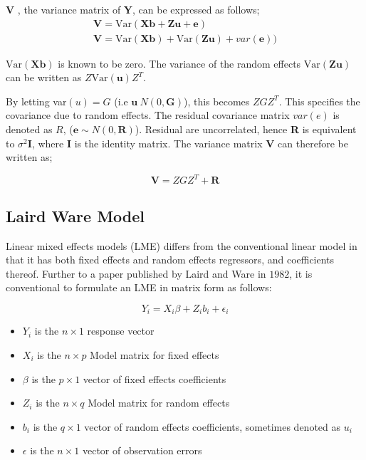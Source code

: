 \documentclass[12pt, a4paper]{report}
\theoremstyle{plain}
\theoremstyle{definition}
\theoremstyle{remark}
\begin{document}

\textbf{V} , the variance matrix of \textbf{Y}, can be expressed
as follows;
\begin{eqnarray}
\textbf{V}= \textrm{Var} ( \textbf{Xb} + \textbf{Zu} + \textbf{e})\\
\textbf{V}= \textrm{Var} ( \textbf{Xb} ) + \textrm{Var} (\textbf{Zu}) +
var(\textbf{e}))
\end{eqnarray}

$\mbox{Var}(\textbf{Xb})$ is known to be zero. The variance of the
random effects $\mbox{Var}(\textbf{Zu})$ can be written as
$Z\mbox{Var}(\textbf{u})Z^{T}$.

By letting var$(u) = G$ (i.e $\textbf{u} ~ N(0,\textbf{G})$), this
becomes $ZGZ^{T}$. This specifies the covariance due to random
effects. The residual covariance matrix $var(e)$ is denoted as
$R$, ($\textbf{e} \sim N(0,\textbf{R})$). Residual are uncorrelated,
hence \textbf{R} is equivalent to $\sigma^{2}$\textbf{I}, where
\textbf{I} is the identity matrix. The variance matrix \textbf{V}
can therefore be written as;

\begin{equation}
\textbf{V}  = ZGZ^{T} + \textbf{R}
\end{equation}




\subsection{Laird Ware Model} Linear mixed effects models (LME)
differs from the conventional linear model in that it has both
fixed effects and random effects regressors, and coefficients
thereof. Further to a paper published by Laird and Ware in $1982$,
it is conventional to formulate  an LME in matrix form as follows:

\begin{displaymath}
Y_{i} =X_{i}\beta + Z_{i}b_{i} + \epsilon_{i}
\end{displaymath}
\begin{itemize}
	\item $Y_{i}$ is the $n \times 1$ response vector \item $X_{i}$ is
	the $n \times p$ Model matrix for fixed effects \item $\beta$ is
	the $p \times 1$ vector of fixed effects coefficients \item
	$Z_{i}$ is the $n \times q$ Model matrix for random effects \item
	$b_{i}$ is the $q \times 1$ vector of random effects coefficients,
	sometimes denoted as $u_{i}$ \item $\epsilon$ is the $n \times 1$
	vector of observation errors
\end{itemize}
\end{document}
